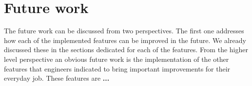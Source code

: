 \section{Future work}
The future work can be discussed from two perspectives. The first one addresses how each of the implemented features can be improved in the future. We already discussed these in the sections dedicated for each of the features. From the higher level perspective an obvious future work is the implementation of the other features that engineers indicated to bring important improvements for their everyday job. These features are \textbf{...}
